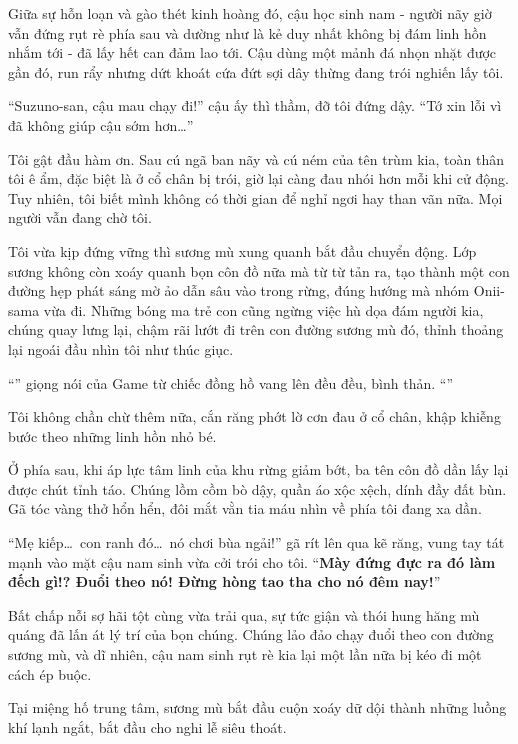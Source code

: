 \documentclass[../main.tex]{subfiles}
\begin{document}
Giữa sự hỗn loạn và gào thét kinh hoàng đó, cậu học sinh nam - người nãy giờ vẫn đứng rụt rè phía sau và dường như là kẻ duy nhất không bị đám linh hồn nhắm tới - đã lấy hết can đảm lao tới. Cậu dùng một mảnh đá nhọn nhặt được gần đó, run rẩy nhưng dứt khoát cứa đứt sợi dây thừng đang trói nghiến lấy tôi.

``Suzuno-san, cậu mau chạy đi!'' cậu ấy thì thầm, đỡ tôi đứng dậy. ``Tớ xin lỗi vì đã không giúp cậu sớm hơn\dots''

Tôi gật đầu hàm ơn. Sau cú ngã ban nãy và cú ném của tên trùm kia, toàn thân tôi ê ẩm, đặc biệt là ở cổ chân bị trói, giờ lại càng đau nhói hơn mỗi khi cử động. Tuy nhiên, tôi biết mình không có thời gian để nghỉ ngơi hay than vãn nữa. Mọi người vẫn đang chờ tôi.

Tôi vừa kịp đứng vững thì sương mù xung quanh bắt đầu chuyển động. Lớp sương không còn xoáy quanh bọn côn đồ nữa mà từ từ tản ra, tạo thành một con đường hẹp phát sáng mờ ảo dẫn sâu vào trong rừng, đúng hướng mà nhóm Onii-sama vừa đi. Những bóng ma trẻ con cũng ngừng việc hù dọa đám người kia, chúng quay lưng lại, chậm rãi lướt đi trên con đường sương mù đó, thỉnh thoảng lại ngoái đầu nhìn tôi như thúc giục.

``'' giọng nói của Game từ chiếc đồng hồ vang lên đều đều, bình thản. ``''

Tôi không chần chừ thêm nữa, cắn răng phớt lờ cơn đau ở cổ chân, khập khiễng bước theo những linh hồn nhỏ bé.

Ở phía sau, khi áp lực tâm linh của khu rừng giảm bớt, ba tên côn đồ dần lấy lại được chút tỉnh táo. Chúng lồm cồm bò dậy, quần áo xộc xệch, dính đầy đất bùn. Gã tóc vàng thở hổn hển, đôi mắt vằn tia máu nhìn về phía tôi đang xa dần.

``Mẹ kiếp\dots\ con ranh đó\dots\ nó chơi bùa ngải!'' gã rít lên qua kẽ răng, vung tay tát mạnh vào mặt cậu nam sinh vừa cởi trói cho tôi. ``\textbf{Mày đứng đực ra đó làm đếch gì!? Đuổi theo nó! Đừng hòng tao tha cho nó đêm nay!}''

Bất chấp nỗi sợ hãi tột cùng vừa trải qua, sự tức giận và thói hung hăng mù quáng đã lấn át lý trí của bọn chúng. Chúng lảo đảo chạy đuổi theo con đường sương mù, và dĩ nhiên, cậu nam sinh rụt rè kia lại một lần nữa bị kéo đi một cách ép buộc.


Tại miệng hố trung tâm, sương mù bắt đầu cuộn xoáy dữ dội thành những luồng khí lạnh ngắt, bắt đầu cho nghi lễ siêu thoát.
\end{document}
